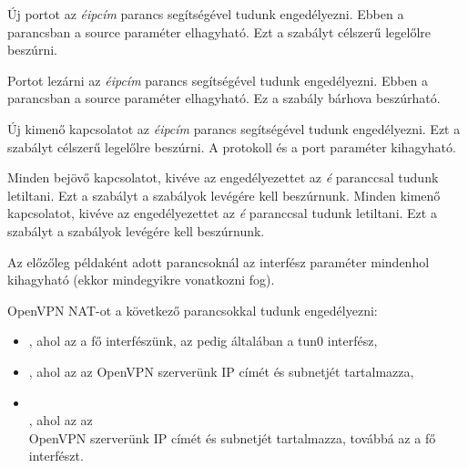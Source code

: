 Új portot az \textit{éipcím} parancs segítségével tudunk engedélyezni. Ebben a parancsban a source paraméter elhagyható. Ezt a szabályt célszerű legelőlre beszúrni.

Portot lezárni az \textit{éipcím} parancs segítségével tudunk engedélyezni. Ebben a parancsban a source paraméter elhagyható. Ez a szabály bárhova beszúrható.

Új kimenő kapcsolatot az \textit{éipcím} parancs segítségével tudunk engedélyezni. Ezt a szabályt célszerű legelőlre beszúrni. A protokoll és a port paraméter kihagyható.

Minden bejövő kapcsolatot, kivéve az engedélyezettet az \textit{é} paranccsal tudunk letiltani. Ezt a szabályt a szabályok levégére kell beszúrnunk.
Minden kimenő kapcsolatot, kivéve az engedélyezettet az \textit{é} paranccsal tudunk letiltani. Ezt a szabályt a szabályok levégére kell beszúrnunk.

Az előzőleg példaként adott parancsoknál az interfész paraméter mindenhol kihagyható (ekkor mindegyikre vonatkozni fog).

OpenVPN NAT-ot a következő parancsokkal tudunk engedélyezni:
\begin{itemize}
	\item {}, ahol az  a fő interfészünk, az  pedig általában a tun0 interfész,
	\item {}, ahol az  az OpenVPN szerverünk IP címét és subnetjét tartalmazza,
	\item {}\\, ahol az  az \\OpenVPN szerverünk IP címét és subnetjét tartalmazza, továbbá az  a fő interfészt.
\end{itemize}


